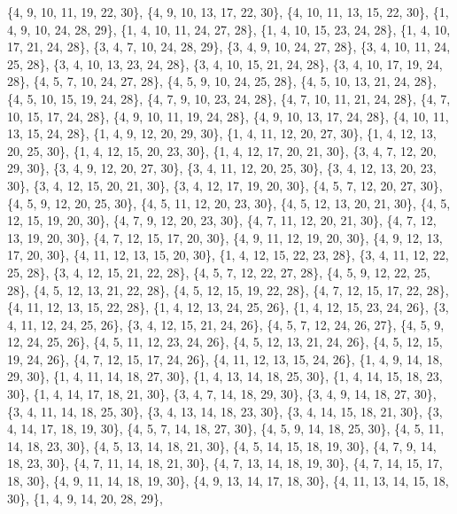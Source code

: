 \documentclass[11pt,a4paper]{article}
\begin{document}
{\{4, 9, 10, 11, 19, 22, 30\}, \{4, 9, 10, 13, 17, 22, 30\}, \{4, 10, 11, 13, 15, 22, 30\}, \{1, 4, 9, 10, 24, 28, 29\}, \{1, 4, 10, 11, 24, 27, 28\},
\{1, 4, 10, 15, 23, 24, 28\}, \{1, 4, 10, 17, 21, 24, 28\}, \{3, 4, 7, 10, 24, 28, 29\}, \{3, 4, 9, 10, 24, 27, 28\}, \{3, 4, 10, 11, 24, 25, 28\},
\{3, 4, 10, 13, 23, 24, 28\}, \{3, 4, 10, 15, 21, 24, 28\}, \{3, 4, 10, 17, 19, 24, 28\}, \{4, 5, 7, 10, 24, 27, 28\}, \{4, 5, 9, 10, 24, 25, 28\},
\{4, 5, 10, 13, 21, 24, 28\}, \{4, 5, 10, 15, 19, 24, 28\}, \{4, 7, 9, 10, 23, 24, 28\}, \{4, 7, 10, 11, 21, 24, 28\}, \{4, 7, 10, 15, 17, 24, 28\},
\{4, 9, 10, 11, 19, 24, 28\}, \{4, 9, 10, 13, 17, 24, 28\}, \{4, 10, 11, 13, 15, 24, 28\}, \{1, 4, 9, 12, 20, 29, 30\}, \{1, 4, 11, 12, 20, 27, 30\},
\{1, 4, 12, 13, 20, 25, 30\}, \{1, 4, 12, 15, 20, 23, 30\}, \{1, 4, 12, 17, 20, 21, 30\}, \{3, 4, 7, 12, 20, 29, 30\}, \{3, 4, 9, 12, 20, 27, 30\},
\{3, 4, 11, 12, 20, 25, 30\}, \{3, 4, 12, 13, 20, 23, 30\}, \{3, 4, 12, 15, 20, 21, 30\}, \{3, 4, 12, 17, 19, 20, 30\}, \{4, 5, 7, 12, 20, 27, 30\},
\{4, 5, 9, 12, 20, 25, 30\}, \{4, 5, 11, 12, 20, 23, 30\}, \{4, 5, 12, 13, 20, 21, 30\}, \{4, 5, 12, 15, 19, 20, 30\}, \{4, 7, 9, 12, 20, 23, 30\},
\{4, 7, 11, 12, 20, 21, 30\}, \{4, 7, 12, 13, 19, 20, 30\}, \{4, 7, 12, 15, 17, 20, 30\}, \{4, 9, 11, 12, 19, 20, 30\}, \{4, 9, 12, 13, 17, 20, 30\},
\{4, 11, 12, 13, 15, 20, 30\}, \{1, 4, 12, 15, 22, 23, 28\}, \{3, 4, 11, 12, 22, 25, 28\}, \{3, 4, 12, 15, 21, 22, 28\}, \{4, 5, 7, 12, 22, 27, 28\},
\{4, 5, 9, 12, 22, 25, 28\}, \{4, 5, 12, 13, 21, 22, 28\}, \{4, 5, 12, 15, 19, 22, 28\}, \{4, 7, 12, 15, 17, 22, 28\}, \{4, 11, 12, 13, 15, 22, 28\},
\{1, 4, 12, 13, 24, 25, 26\}, \{1, 4, 12, 15, 23, 24, 26\}, \{3, 4, 11, 12, 24, 25, 26\}, \{3, 4, 12, 15, 21, 24, 26\}, \{4, 5, 7, 12, 24, 26, 27\},
\{4, 5, 9, 12, 24, 25, 26\}, \{4, 5, 11, 12, 23, 24, 26\}, \{4, 5, 12, 13, 21, 24, 26\}, \{4, 5, 12, 15, 19, 24, 26\}, \{4, 7, 12, 15, 17, 24, 26\},
\{4, 11, 12, 13, 15, 24, 26\}, \{1, 4, 9, 14, 18, 29, 30\}, \{1, 4, 11, 14, 18, 27, 30\}, \{1, 4, 13, 14, 18, 25, 30\}, \{1, 4, 14, 15, 18, 23, 30\},
\{1, 4, 14, 17, 18, 21, 30\}, \{3, 4, 7, 14, 18, 29, 30\}, \{3, 4, 9, 14, 18, 27, 30\}, \{3, 4, 11, 14, 18, 25, 30\}, \{3, 4, 13, 14, 18, 23, 30\},
\{3, 4, 14, 15, 18, 21, 30\}, \{3, 4, 14, 17, 18, 19, 30\}, \{4, 5, 7, 14, 18, 27, 30\}, \{4, 5, 9, 14, 18, 25, 30\}, \{4, 5, 11, 14, 18, 23, 30\},
\{4, 5, 13, 14, 18, 21, 30\}, \{4, 5, 14, 15, 18, 19, 30\}, \{4, 7, 9, 14, 18, 23, 30\}, \{4, 7, 11, 14, 18, 21, 30\}, \{4, 7, 13, 14, 18, 19, 30\},
\{4, 7, 14, 15, 17, 18, 30\}, \{4, 9, 11, 14, 18, 19, 30\}, \{4, 9, 13, 14, 17, 18, 30\}, \{4, 11, 13, 14, 15, 18, 30\}, \{1, 4, 9, 14, 20, 28, 29\},
}
\end{document}
